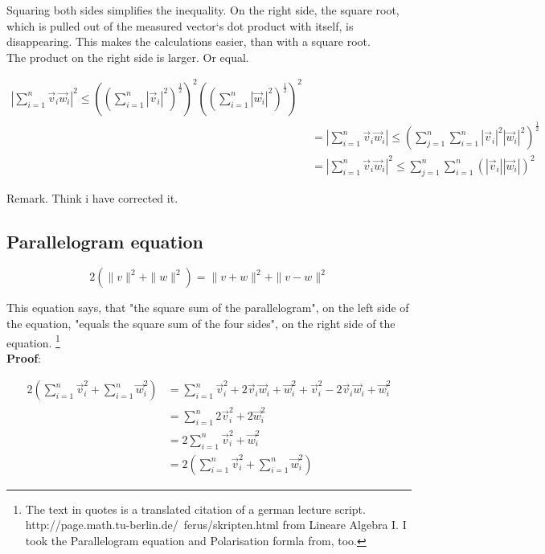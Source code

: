 \documentclass[a4paper]{article}
\begin{document}
\begin{Example}
Squaring both sides simplifies the inequality. On the right side, the square root, which is pulled out of the measured vector`s dot product with itself, is disappearing. This makes the calculations easier, than with a square root.\\

The product on the right side is larger. Or equal. 

\begin{displaymath}
\begin{align}    
    |\sum_{i=1}^{n}\vec{v}_{i}\vec{w}_{i}|^{2} \leq ((\sum_{i=1}^{n}|\vec{v}_{i}|^{2})^{\frac{1}{2}})^{2}((\sum_{i=1}^{n}|\vec{w}_{i}|^{2})^{\frac{1}{2}})^{2}\\
    &= |\sum_{i=1}^{n}\vec{v}_{i}\vec{w}_{i}| \leq (\sum_{j=1}^{n}\sum_{i=1}^{n}|\vec{v}_{i}|^{2}|\vec{w}_{i}|^{2})^{\frac{1}{2}}\\
&=
|\sum_{i=1}^{n}\vec{v}_{i}\vec{w}_{i}|^{2} \leq \sum_{j=1}^{n}\sum_{i=1}^{n}(|\vec{v}_{i}||\vec{w}_{i}|)^{2}
\end{align}
\end{displaymath}

Remark. Think i have corrected it.

\subsection{Parallelogram equation}

\begin{displaymath}
2(\|v\|^{2} + \|w\|^{2}) = \|v+w\|^{2}+\|v-w\|^{2}
\end{displaymath}

This equation says, that "the square sum of the parallelogram", on the left side of the equation, "equals the square sum of the four sides", on the right side of the equation. \footnote{The text in quotes is a translated citation of a german lecture script. http://page.math.tu-berlin.de/~ferus/skripten.html from Lineare Algebra I. I took the Parallelogram equation and Polarisation formla from, too.}\\

\textbf{Proof}:

\begin{displaymath}
\begin{align}
2(\sum_{i=1}^{n}\vec{v}_{i}^{2} + \sum_{i=1}^{n}\vec{w}_{i}^{2}) &= \sum_{i=1}^{n}\vec{v}_{i}^{2}+2\vec{v}_{i}\vec{w}_{i}+\vec{w}_{i}^{2}+\vec{v}_{i}^{2}-2\vec{v}_{i}\vec{w}_{i}+\vec{w}_{i}^{2}\\
&= \sum_{i=1}^{n}2\vec{v}_{i}^{2}+2\vec{w}_{i}^2\\ 
&= 2\sum_{i=1}^{n}\vec{v}_{i}^{2}+\vec{w}_{i}^{2} \\
&= 2(\sum_{i=1}^{n}\vec{v}_{i}^{2} + \sum_{i=1}^{n}\vec{w}_{i}^{2})
\end{align}
\end{displaymath}


\end{Example}
\end{document}
